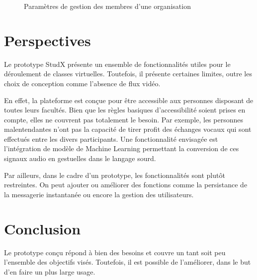 \begin{figure}[h]
  \centering
  \caption{Paramètres de gestion des membres d'une organisation}
  \label{fig:settings_two}
\end{figure}

\newpage
\section{Perspectives}
Le prototype StudX présente un ensemble de fonctionnalités utiles pour le déroulement de classes virtuelles. 
Toutefois, il présente certaines limites, outre les choix de conception comme l’absence de flux vidéo. 

En effet, la plateforme est conçue pour être accessible aux personnes disposant de toutes leurs facultés. 
Bien que les règles basiques d'accessibilité soient prises en compte, 
elles ne couvrent pas totalement le besoin. Par exemple, les personnes malentendantes 
n’ont pas la capacité de tirer profit des échanges vocaux qui sont effectués entre les divers participants. 
Une fonctionnalité envisagée est l'intégration de modèle de Machine Learning permettant la conversion de 
ces signaux audio en gestuelles dans le langage sourd.

Par ailleurs, dans le cadre d’un prototype, les fonctionnalités sont plutôt restreintes. 
On peut ajouter ou améliorer des fonctions comme la persistance de la messagerie instantanée ou 
encore la gestion des utilisateurs.


\section*{Conclusion}
Le prototype conçu répond à bien des besoins et couvre un tant soit peu l’ensemble des objectifs visés. 
Toutefois, il est possible de l’améliorer, dans le but d’en faire un plus large usage.